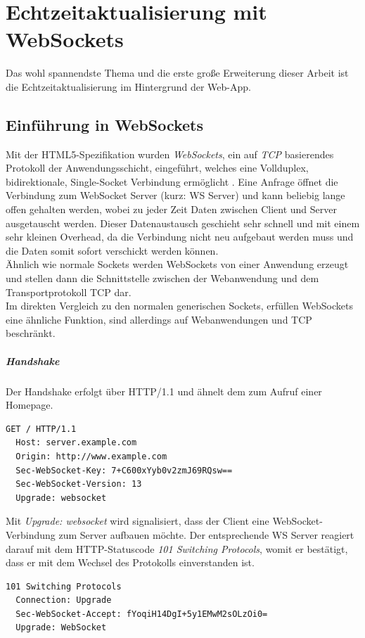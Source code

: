 \chapter{Echtzeitaktualisierung mit WebSockets}
Das wohl spannendste Thema und die erste große Erweiterung dieser Arbeit ist die Echtzeitaktualisierung im Hintergrund der Web-App.

\section{Einführung in WebSockets}
Mit der HTML5-Spezifikation wurden \emph{WebSockets}, ein auf \emph{TCP} basierendes Protokoll der Anwendungsschicht, eingeführt, welches eine Vollduplex, bidirektionale, Single-Socket Verbindung ermöglicht \cite[S. 7]{ws}. Eine Anfrage öffnet die Verbindung zum WebSocket Server (kurz: WS Server) und kann beliebig lange offen gehalten werden, wobei zu jeder Zeit Daten zwischen Client und Server ausgetauscht werden. Dieser Datenaustausch geschieht sehr schnell und mit einem sehr kleinen Overhead, da die Verbindung nicht neu aufgebaut werden muss und die Daten somit sofort verschickt werden können.\\
Ähnlich wie \glqq normale\grqq{} Sockets werden WebSockets von einer Anwendung erzeugt und stellen dann die Schnittstelle zwischen der Webanwendung und dem Transportprotokoll TCP dar.\\
Im direkten Vergleich zu den normalen generischen Sockets, erfüllen WebSockets eine ähnliche Funktion, sind allerdings auf Webanwendungen und TCP beschränkt. 

\paragraph{Handshake} 
Der Handshake erfolgt über HTTP/1.1 und ähnelt dem zum Aufruf einer Homepage.
\\
\begin{lstlisting}[captionpos=b, caption=HTTP Request des Clients {\cite[S. 6]{rfc6455:handshake}}]
  GET / HTTP/1.1
  Host: server.example.com
  Origin: http://www.example.com
  Sec-WebSocket-Key: 7+C600xYyb0v2zmJ69RQsw==
  Sec-WebSocket-Version: 13
  Upgrade: websocket
\end{lstlisting}

Mit \emph{Upgrade: websocket} wird signalisiert, dass der Client eine WebSocket-Verbindung zum Server aufbauen möchte. Der entsprechende WS Server reagiert darauf mit dem HTTP-Statuscode \emph{101 Switching Protocols}, womit er bestätigt, dass er mit dem Wechsel des Protokolls einverstanden ist.
\\
\begin{lstlisting}[captionpos=b, caption=HTTP Response des Servers {\cite[S. 8]{rfc6455:handshake}}]
  101 Switching Protocols
  Connection: Upgrade
  Sec-WebSocket-Accept: fYoqiH14DgI+5y1EMwM2sOLzOi0=
  Upgrade: WebSocket
\end{lstlisting}

